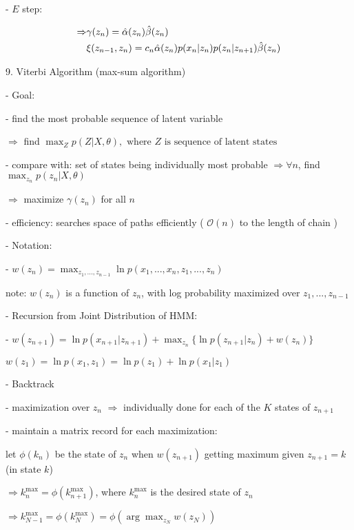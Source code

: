      - $E$ step:

       \begin{align}\displaystyle \Rightarrow \space & \gamma(z_n) = \hat\alpha(z_n)\hat\beta(z_n) \\ & \xi(z_{n-1},z_n) = c_n \hat\alpha(z_n)p(x_n|z_n)p(z_n|z_{n+1})\hat\beta(z_n) \end{align}

9. Viterbi Algorithm (max-sum algorithm)

   - Goal:

     - find the most probable sequence of latent variable

       $\Rightarrow$ find $\displaystyle\max_{Z} p(Z|X,\theta), \text{ where $Z$ is sequence of latent states}$ 

     - compare with: set of states being individually most probable $\Rightarrow \forall n$, find $\displaystyle \max_{z_n} p(z_n|X,\theta)$ 

       $\Rightarrow$ maximize $\gamma(z_n)$ for all $n$ 

     - efficiency: searches space of paths efficiently ( $\mathcal O(n)$ to the length of chain )

   - Notation:

     - $\displaystyle w(z_n) = \max_{z_1,...,z_{n-1}} \ln p(x_1,...,x_n,z_1,...,z_n)$ 

       note: $w(z_n)$ is a function of $z_n$, with log probability maximized over $z_1,...,z_{n-1}$ 

   - Recursion from Joint Distribution of HMM:

     - $\displaystyle  w(z_{n+1}) = \ln p(x_{n+1}|z_{n+1}) + \max _{z_{n}} \{ \ln p(z_{n+1}|z_{n}) + w(z_{n}) \}$  

       $\displaystyle w(z_1) =\ln p(x_1,z_1) = \ln p(z_1) + \ln p(x_1|z_1) $ 

   - Backtrack

     - maximization over $z_n$ $\Rightarrow$ individually done for each of the $K$ states of $z_{n+1}$

     - maintain a matrix record for each maximization:

       let $\phi(k_n)$ be the state of $z_n$ when $w(z_{n+1})$ getting maximum given $z_{n+1} = k$ (in state $k$) 

       $\Rightarrow k_n^\text{max} = \phi(k_{n+1}^\text{max})$, where $k_n^\text{max}$ is the desired state of $z_n$

       $\displaystyle \Rightarrow k_{N-1}^\text{max} = \phi(k_{N}^\text{max})=\phi(\arg\max_{z_{N}}w(z_{N}))$   

